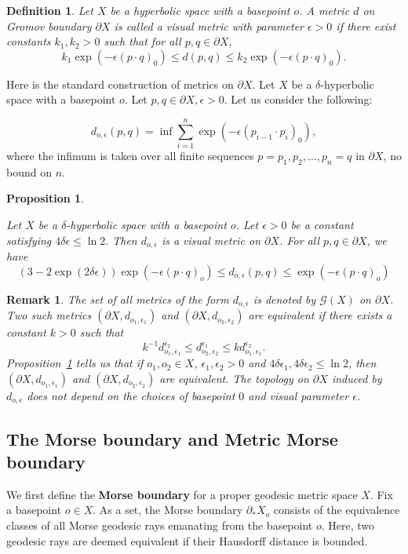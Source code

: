 \documentclass[a4paper,11pt,oneside]{article}
\newtheorem{Definition}[Theorem]{Definition}
\newtheorem{Proposition}[Theorem]{Proposition}
\newtheorem{Remark}[Theorem]{Remark}
\begin{document}
 
\begin{Definition}
  Let $X$ be a hyperbolic space with a basepoint $o$. A metric $d$ on Gromov boundary $\partial X$ is called a visual metric with parameter $\epsilon>0$ if there exist constants $k_1,k_2>0$ such that for all $p,q\in \partial X$,
  $$k_1\exp{(-\epsilon(p\cdot q)_0)}\le d(p,q)\le k_2\exp{(-\epsilon(p\cdot q)_0)}.$$

\end{Definition}
Here is the standard construction of metrics on $\partial X$. Let $X$ be a $\delta$-hyperbolic space with a basepoint $o$. Let $p, q\in \partial X, \epsilon>0$. Let us consider the following:

$$d_{o,\epsilon}(p,q)=\inf\sum_{i=1}^n\exp{(-\epsilon(p_{i-1}\cdot p_i)_0)},$$
 where the infimum is taken over all finite sequences $p=p_1, p_2, \dots, p_n=q$ in $\partial X$,  no bound on $n$.


\begin{Proposition}\label{VisMetric}

    Let $X$ be a $\delta$-hyperbolic space with a basepoint $o$. Let $\epsilon>0$ be a constant satisfying $4\delta\epsilon\le\ln{2}.$ Then $d_{o,\epsilon }$ is a visual metric on $\partial X$.  For all $p,q\in \partial X$, we have 
    $$(3-2\exp{(2\delta\epsilon)})\exp{(-\epsilon(p\cdot q)_o)}\le d_{o,\epsilon}(p,q)\le \exp{(-\epsilon(p\cdot q)_o)}$$
\end{Proposition}

\begin{Remark}
    The set of all metrics of the form $d_{o,\epsilon}$ is denoted by $\mathcal{G}(X)$ on $\partial X$. Two such metrics $(\partial X, d_{o_1,\epsilon_1})$ and $(\partial X, d_{o_2,\epsilon_2})$ are equivalent if there exists a constant $k>0$ such that $$k^{-1}d_{o_1,\epsilon_1}^{\epsilon_2}\le d_{o_2,\epsilon_2}^{\epsilon_1}\le k d_{o_1,\epsilon_1}^{\epsilon_2}.$$
    Proposition~\ref{VisMetric} tells us that if $o_1,o_2\in X$, $\epsilon_1,\epsilon_2>0$ and $4\delta\epsilon_1,4\delta\epsilon_2\le \ln{2}$, then $(\partial X, d_{o_1,\epsilon_1})$ and $(\partial X, d_{o_2, \epsilon_2})$ are equivalent. The topology on $\partial X$ induced by $d_{o,\epsilon}$ does not depend on the choices of basepoint $0$ and visual parameter $\epsilon$.
\end{Remark}

\subsection{The Morse boundary and Metric Morse boundary}
We first define the \textbf{Morse boundary} for a proper geodesic metric space \( X \). Fix a basepoint \( o \in X \). 
As a set, the Morse boundary \( \partial_*X_o \) consists of the equivalence classes of all Morse geodesic rays emanating from the basepoint \( o \). Here, two geodesic rays are deemed equivalent if their Hausdorff distance is bounded.
\end{document}
